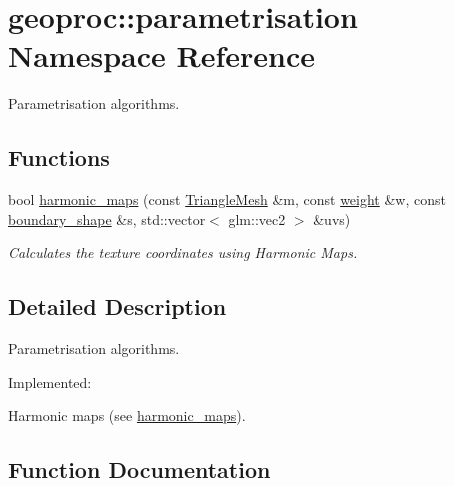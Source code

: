 \hypertarget{namespacegeoproc_1_1parametrisation}{}\section{geoproc\+:\+:parametrisation Namespace Reference}
\label{namespacegeoproc_1_1parametrisation}


Parametrisation algorithms.  


\subsection*{Functions}
\begin{DoxyCompactItemize}
\item 
bool \hyperlink{namespacegeoproc_1_1parametrisation_a88891cbeadf541ab81be9333c0c232b3}{harmonic\+\_\+maps} (const \hyperlink{classgeoproc_1_1TriangleMesh}{Triangle\+Mesh} \&m, const \hyperlink{namespacegeoproc_a12e5a10581b53b9dd9a509127527f843}{weight} \&w, const \hyperlink{namespacegeoproc_a494da744a805b80f842402f0a806ccfc}{boundary\+\_\+shape} \&s, std\+::vector$<$ glm\+::vec2 $>$ \&uvs)
\begin{DoxyCompactList}\small\item\em Calculates the texture coordinates using Harmonic Maps. \end{DoxyCompactList}\end{DoxyCompactItemize}


\subsection{Detailed Description}
Parametrisation algorithms. 

Implemented\+:
\begin{DoxyItemize}
\item Harmonic maps (see \hyperlink{namespacegeoproc_1_1parametrisation_a88891cbeadf541ab81be9333c0c232b3}{harmonic\+\_\+maps}). 
\end{DoxyItemize}

\subsection{Function Documentation}
\mbox{\label{namespacegeoproc_1_1parametrisation_a88891cbeadf541ab81be9333c0c232b3}} 
